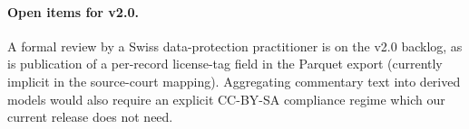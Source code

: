 \paragraph{Open items for v2.0.} A formal review by a Swiss
data-protection practitioner is on the v2.0 backlog, as is publication
of a per-record license-tag field in the Parquet export (currently
implicit in the source-court mapping). Aggregating commentary text
into derived models would also require an explicit CC-BY-SA
compliance regime which our current release does not need.
